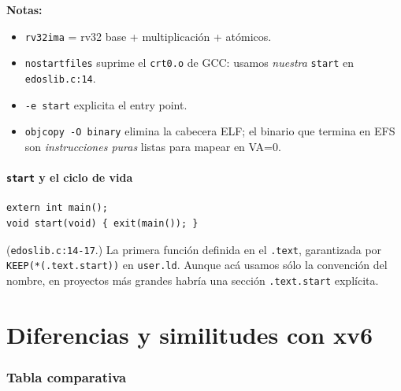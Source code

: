 \documentclass[11pt,a4paper]{article}
\begin{document}
\textbf{Notas:}

\begin{itemize}[leftmargin=*,nosep]
    \item \texttt{rv32ima} = rv32 base + multiplicación + atómicos.
    \item \texttt{nostartfiles} suprime el \texttt{crt0.o} de
        GCC: usamos \emph{nuestra} \texttt{start} en \texttt{edoslib.c:14}.
    \item \texttt{-e start} explicita el entry point.
    \item \texttt{objcopy -O binary} elimina la cabecera ELF; el
        binario que termina en EFS son \emph{instrucciones puras}
        listas para mapear en VA=0.
\end{itemize}

\subsection*{\texttt{start} y el ciclo de vida}

\begin{lstlisting}[style=cstyle]
extern int main();
void start(void) { exit(main()); }
\end{lstlisting}

(\texttt{edoslib.c:14-17}.) La primera función definida en el
\texttt{.text}, garantizada por \texttt{KEEP(*(.text.start))} en
\texttt{user.ld}. Aunque acá usamos sólo la convención del nombre,
en proyectos más grandes habría una sección \texttt{.text.start}
explícita.

\part{Diferencias y similitudes con xv6}

\section{Tabla comparativa}
\end{document}
